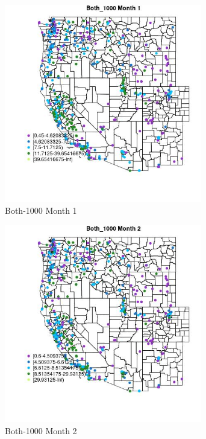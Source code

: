 \begin{figure} 
\centering  
\includegraphics[width=0.77\textwidth]{Code_Outputs/ML_input_report_ML_input_PM25_Step5_part_d_de_duplicated_aves_ML_input_MapObsMo1Both_1000.jpg} 
\caption{\label{fig:ML_input_report_ML_input_PM25_Step5_part_d_de_duplicated_aves_ML_inputMapObsMo1Both_1000}Both-1000 Month 1} 
\end{figure} 
 

\begin{figure} 
\centering  
\includegraphics[width=0.77\textwidth]{Code_Outputs/ML_input_report_ML_input_PM25_Step5_part_d_de_duplicated_aves_ML_input_MapObsMo2Both_1000.jpg} 
\caption{\label{fig:ML_input_report_ML_input_PM25_Step5_part_d_de_duplicated_aves_ML_inputMapObsMo2Both_1000}Both-1000 Month 2} 
\end{figure} 
 

